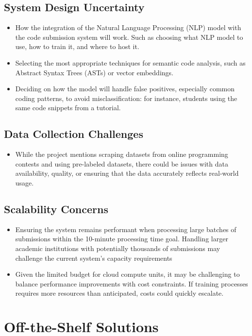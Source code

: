 \documentclass[12pt]{article}
\begin{document}
\subsection{System Design Uncertainty}
\begin{itemize}
    \item How the integration of the Natural Language Processing (NLP) model with the code submission system will work. Such as choosing what NLP model to use, how to train it, and where to host it.
    \item Selecting the most appropriate techniques for semantic code analysis, such as Abstract Syntax Trees (ASTs) or vector embeddings.
    \item Deciding on how the model will handle false positives, especially common coding patterns, to avoid misclassification: for instance, students using the same code snippets from a tutorial.
\end{itemize}

\subsection {Data Collection Challenges}
\begin{itemize}
    \item While the project mentions scraping datasets from online programming contests and using pre-labeled datasets, 
    there could be issues with data availability, quality, or ensuring that the data accurately reflects real-world usage.
\end{itemize}

\subsection {Scalability Concerns}
\begin{itemize}
    \item Ensuring the system remains performant when processing large batches of submissions within the 10-minute processing time goal. 
    Handling larger academic institutions with potentially thousands of submissions may challenge the current system's capacity requirements
    \item  Given the limited budget for cloud compute units, it may be challenging to balance performance improvements with cost constraints. 
    If training processes requires more resources than anticipated, costs could quickly escalate.
\end{itemize}
\section{Off-the-Shelf Solutions}
\end{document}

